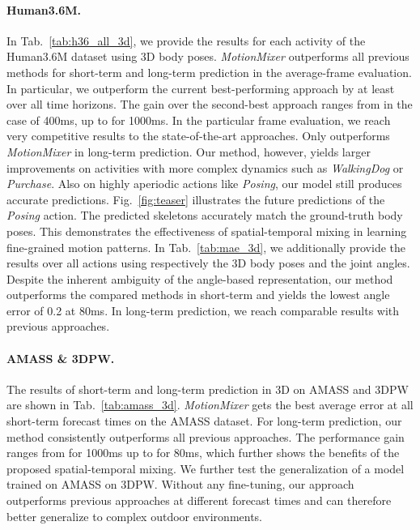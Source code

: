 \documentclass{article}
\begin{document}
\paragraph{Human3.6M.} In Tab.~\ref{tab:h36_all_3d}, we provide the results for each activity of the Human3.6M dataset using 3D body poses. \textit{MotionMixer} outperforms all previous methods for short-term and long-term prediction in the average-frame evaluation. In particular, we outperform the current best-performing approach \cite{zhong2022spatial} by at least  over all time horizons. The gain over the second-best approach \cite{sofianos2021space} ranges from  in the case of 400ms, up to  for 1000ms. In the particular frame evaluation, we reach very competitive results to the state-of-the-art approaches. Only \cite{mao2021multi} outperforms \textit{MotionMixer} in long-term prediction. Our method, however, yields larger improvements on activities with more complex dynamics such as \textit{WalkingDog} or \textit{Purchase}. Also on highly aperiodic actions like \textit{Posing}, our model still produces accurate predictions. Fig.~\ref{fig:teaser} illustrates the future predictions of the \textit{Posing} action. The predicted skeletons accurately match the ground-truth body poses. This demonstrates the effectiveness of  spatial-temporal mixing in learning fine-grained motion patterns.  In Tab.~\ref{tab:mae_3d}, we additionally provide the results over all actions using respectively the 3D body poses and the joint angles. Despite the inherent ambiguity of the angle-based representation, our method outperforms the compared methods in short-term and yields the lowest angle error of 0.2 at 80ms. In long-term prediction, we reach comparable results with previous approaches. 


\paragraph{AMASS \& 3DPW.} The results of short-term and long-term prediction in 3D on AMASS and 3DPW are shown in Tab.~\ref{tab:amass_3d}. \textit{MotionMixer} gets the best average error at all short-term forecast times on the AMASS dataset. For long-term prediction, our method consistently outperforms all previous approaches. The performance gain ranges from  for 1000ms up to  for 80ms, which further shows the benefits of the proposed spatial-temporal mixing. We further test the generalization of a model trained on AMASS on 3DPW. Without any fine-tuning, our approach outperforms previous approaches at different forecast times and can therefore better generalize to complex outdoor environments.
\end{document}
